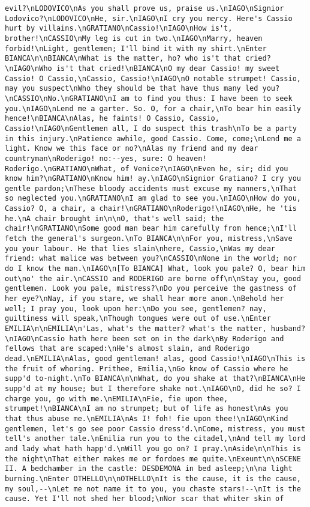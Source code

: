 \begin{verbatim}
evil?\nLODOVICO\nAs you shall prove us, praise us.\nIAGO\nSignior Lodovico?\nLODOVICO\nHe, sir.\nIAGO\nI cry you mercy. Here's Cassio hurt by villains.\nGRATIANO\nCassio!\nIAGO\nHow is't, brother!\nCASSIO\nMy leg is cut in two.\nIAGO\nMarry, heaven forbid!\nLight, gentlemen; I'll bind it with my shirt.\nEnter BIANCA\n\nBIANCA\nWhat is the matter, ho? who is't that cried?\nIAGO\nWho is't that cried!\nBIANCA\nO my dear Cassio! my sweet Cassio! O Cassio,\nCassio, Cassio!\nIAGO\nO notable strumpet! Cassio, may you suspect\nWho they should be that have thus many led you?\nCASSIO\nNo.\nGRATIANO\nI am to find you thus: I have been to seek you.\nIAGO\nLend me a garter. So. O, for a chair,\nTo bear him easily hence!\nBIANCA\nAlas, he faints! O Cassio, Cassio, Cassio!\nIAGO\nGentlemen all, I do suspect this trash\nTo be a party in this injury.\nPatience awhile, good Cassio. Come, come;\nLend me a light. Know we this face or no?\nAlas my friend and my dear countryman\nRoderigo! no:--yes, sure: O heaven! Roderigo.\nGRATIANO\nWhat, of Venice?\nIAGO\nEven he, sir; did you know him?\nGRATIANO\nKnow him! ay.\nIAGO\nSignior Gratiano? I cry you gentle pardon;\nThese bloody accidents must excuse my manners,\nThat so neglected you.\nGRATIANO\nI am glad to see you.\nIAGO\nHow do you, Cassio? O, a chair, a chair!\nGRATIANO\nRoderigo!\nIAGO\nHe, he 'tis he.\nA chair brought in\n\nO, that's well said; the chair!\nGRATIANO\nSome good man bear him carefully from hence;\nI'll fetch the general's surgeon.\nTo BIANCA\n\nFor you, mistress,\nSave you your labour. He that lies slain\nhere, Cassio,\nWas my dear friend: what malice was between you?\nCASSIO\nNone in the world; nor do I know the man.\nIAGO\n[To BIANCA] What, look you pale? O, bear him out\no' the air.\nCASSIO and RODERIGO are borne off\n\nStay you, good gentlemen. Look you pale, mistress?\nDo you perceive the gastness of her eye?\nNay, if you stare, we shall hear more anon.\nBehold her well; I pray you, look upon her:\nDo you see, gentlemen? nay, guiltiness will speak,\nThough tongues were out of use.\nEnter EMILIA\n\nEMILIA\n'Las, what's the matter? what's the matter, husband?\nIAGO\nCassio hath here been set on in the dark\nBy Roderigo and fellows that are scaped:\nHe's almost slain, and Roderigo dead.\nEMILIA\nAlas, good gentleman! alas, good Cassio!\nIAGO\nThis is the fruit of whoring. Prithee, Emilia,\nGo know of Cassio where he supp'd to-night.\nTo BIANCA\n\nWhat, do you shake at that?\nBIANCA\nHe supp'd at my house; but I therefore shake not.\nIAGO\nO, did he so? I charge you, go with me.\nEMILIA\nFie, fie upon thee, strumpet!\nBIANCA\nI am no strumpet; but of life as honest\nAs you that thus abuse me.\nEMILIA\nAs I! foh! fie upon thee!\nIAGO\nKind gentlemen, let's go see poor Cassio dress'd.\nCome, mistress, you must tell's another tale.\nEmilia run you to the citadel,\nAnd tell my lord and lady what hath happ'd.\nWill you go on? I pray.\nAside\n\nThis is the night\nThat either makes me or fordoes me quite.\nExeunt\n\nSCENE II. A bedchamber in the castle: DESDEMONA in bed asleep;\n\na light burning.\nEnter OTHELLO\n\nOTHELLO\nIt is the cause, it is the cause, my soul,--\nLet me not name it to you, you chaste stars!--\nIt is the cause. Yet I'll not shed her blood;\nNor scar that whiter skin of 
\end{verbatim}
